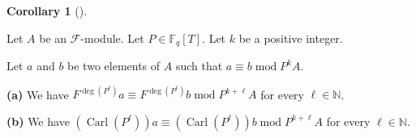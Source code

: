 \documentclass[numbers=enddot,12pt,final,onecolumn,notitlepage]{scrartcl}%
\theoremstyle{definition}
\newtheorem{coro}[theo]{Corollary}
\newenvironment{corollary}[1][]
{\begin{coro}[#1]\begin{leftbar}}
{\end{leftbar}\end{coro}}
\begin{document}
\begin{corollary}
\label{cor.F.lift.lift-Pl}Let $A$ be an $\mathcal{F}$-module. Let
$P\in\mathbb{F}_{q}\left[  T\right]  $. Let $k$ be a positive integer.

Let $a$ and $b$ be two elements of $A$ such that $a\equiv b\operatorname{mod}%
P^{k}A$.

\textbf{(a)} We have $F^{\deg\left(  P^{\ell}\right)  }a\equiv F^{\deg\left(
P^{\ell}\right)  }b\operatorname{mod}P^{k+\ell}A$ for every $\ell\in
\mathbb{N}$.

\textbf{(b)} We have $\left(  \operatorname*{Carl}\left(  P^{\ell}\right)
\right)  a\equiv\left(  \operatorname*{Carl}\left(  P^{\ell}\right)  \right)
b\operatorname{mod}P^{k+\ell}A$ for every $\ell\in\mathbb{N}$.
\end{corollary}
\end{document}
